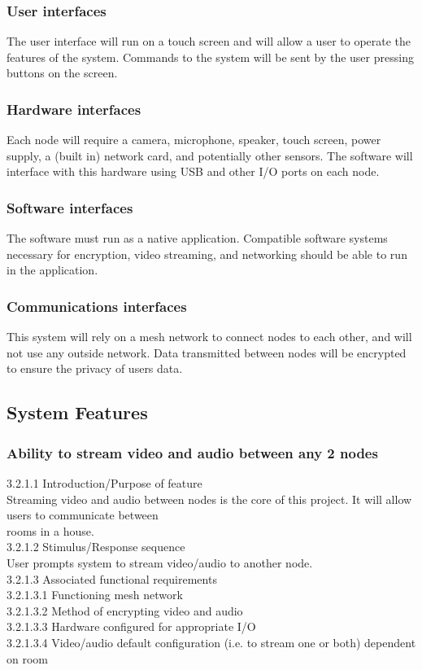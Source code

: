 \documentclass[onecolumn, draftclsnofoot,10pt, compsoc]{IEEEtran}
\newcommand\tab[1][1cm]{\hspace*{#1}}
\begin{document}
\subsubsection{User interfaces}
The user interface will run on a touch screen and will allow a user to operate the features of the system. Commands to the system will be sent by the user pressing buttons on the screen.

\subsubsection{Hardware interfaces}
Each node will require a camera, microphone, speaker, touch screen, power supply, a (built in) network card, and potentially other sensors. The software will interface with this hardware using USB and other I/O ports on each node. 

\subsubsection{Software interfaces}
The software must run as a native application. Compatible software systems necessary for encryption, video streaming, and networking should be able to run in the application. 

\subsubsection{Communications interfaces}
This system will rely on a mesh network to connect nodes to each other, and will not use any outside network. Data transmitted between nodes will be encrypted to ensure the privacy of users\textquotesingle{} data. 

\subsection{System Features}

\subsubsection{Ability to stream video and audio between any 2 nodes}
\tab 3.2.1.1  Introduction/Purpose of feature \\
\tab Streaming video and audio between nodes is the core of this project. It will allow users to communicate between \\ \tab rooms in a house. \\ 
\tab 3.2.1.2  Stimulus/Response sequence \\
\tab User prompts system to stream video/audio to another node. \\ 
\tab 3.2.1.3  Associated functional requirements \\
\tab \tab 3.2.1.3.1  Functioning mesh network \\
\tab \tab 3.2.1.3.2  Method of encrypting video and audio \\
\tab \tab 3.2.1.3.3  Hardware configured for appropriate I/O \\
\tab \tab 3.2.1.3.4  Video/audio default configuration (i.e. to stream one or both) dependent on room
\end{document}
